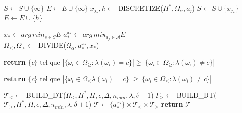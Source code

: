 \documentclass[a4paper]{article}
\begin{document}
\begin{algorithm}[H]
\begin{algorithmic}
     \State $S \gets S \cup \{\infty\}$
    	\State $E \gets E \cup \{\infty\}$
    \Else
        \State $x_{j_*}, h \gets$ DISCRETIZE($H^*, \Omega_{\alpha}, a_j$) 
        \State $S \gets S \cup \{x_{j_*}\}$
        \State $E \gets E \cup \{h\}$ \\
    \EndIf
\EndFor

\State $x_* \gets arg\,min_{s \in S} E$ %
\State $a^{x_*}_*\gets arg\,min_{a_j \in \mathcal{A}} E $ \\ %

\State $\Omega_{\leq}, \Omega_{\geq}\gets$ DIVIDE($\Omega_{\alpha}, a^{x_*}_*,
    x_*$) 

    \State \textbf{return} $\{c\}$ tel que $|\{\omega_i \in \Omega_{\geq}:
    \lambda(\omega_i) = c\}| \geq |\{\omega_i \in \Omega_{\geq}:
    \lambda(\omega_i) \neq c\}|$
\EndIf

    \State \textbf{return} $\{c\}$ tel que $|\{\omega_i \in \Omega_{\leq}
    \lambda(\omega_i) = c\}| \geq |\{\omega_i \in \Omega_{\leq}:
    \lambda(\omega_i) \neq c\}|$
\EndIf

\State $\mathcal{T}_{\leq}\gets$ BUILD\_DT($\Omega_{\leq}, H^*, H, \epsilon, \Delta,
    n_{min}, \lambda, \delta +1$) 
\State $\Gamma_{\geq}\gets$
    BUILD\_DT($\mathcal{T}_{\geq}, H^*, H, \epsilon, \Delta, n_{min}, \lambda, \delta
    +1$)
\State $\mathcal{T} \gets \{a^{x_*}_*\} \times \mathcal{T}_{\leq} \times \mathcal{T}_{\geq}$ 
\State \textbf{return} $\mathcal{T}$

\EndProcedure
\end{algorithmic}
\end{algorithm}
\end{document}
